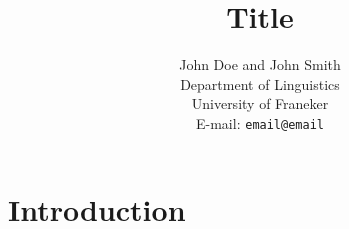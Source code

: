 \documentclass[a4paper,11pt]{article}
\title{Title}
\author{John Doe and John Smith
\\[0.5cm] Department of Linguistics
\\University of Franeker
\\E-mail: \texttt{email@email}}
\date{}
\begin{document}
\maketitle

\begin{abstract}
\noindent

\end{abstract} 

\thispagestyle{empty}

\section{Introduction}

\begin{thebibliography}{mybib}
\end{thebibliography}
\end{document}

